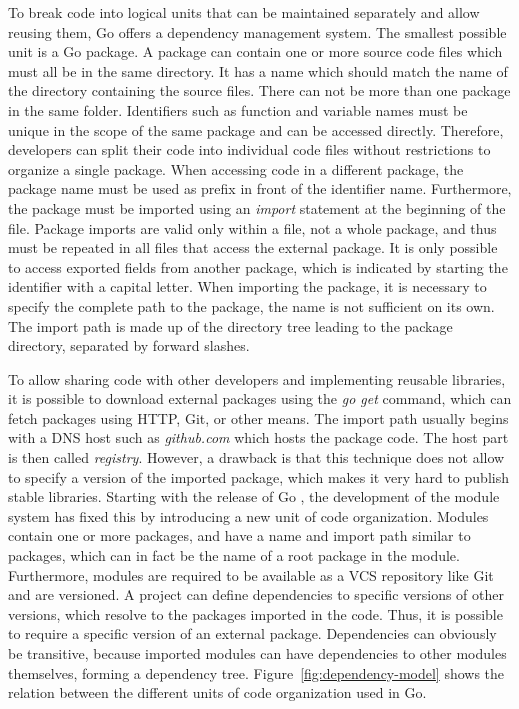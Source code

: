 To break code into logical units that can be maintained separately and allow reusing them, Go offers a dependency
management system.
The smallest possible unit is a Go package.
A package can contain one or more source code files which must all be in the same directory.
It has a name which should match the name of the directory containing the source files.
There can not be more than one package in the same folder.
Identifiers such as function and variable names must be unique in the scope of the same package and can be accessed
directly.
Therefore, developers can split their code into individual code files without restrictions to organize a single package.
When accessing code in a different package, the package name must be used as prefix in front of the identifier name.
Furthermore, the package must be imported using an \textit{import} statement at the beginning of the file.
Package imports are valid only within a file, not a whole package, and thus must be repeated in all files that access
the external package.
It is only possible to access exported fields from another package, which is indicated by starting the identifier with
a capital letter.
When importing the package, it is necessary to specify the complete path to the package, the name is not sufficient on
its own.
The import path is made up of the directory tree leading to the package directory, separated by forward slashes.

To allow sharing code with other developers and implementing reusable libraries, it is possible to download external
packages using the \textit{go get} command, which can fetch packages using \acrshort{HTTP}, Git, or other means.
The import path usually begins with a \acrshort{DNS} host such as \textit{github.com} which hosts the package code.
The host part is then called \textit{registry}.
However, a drawback is that this technique does not allow to specify a version of the imported package, which makes it
very hard to publish stable libraries.
Starting with the release of Go , the development of the module system has fixed this by introducing a
new unit of code organization.
Modules contain one or more packages, and have a name and import path similar to packages, which can in fact be the name
of a root package in the module.
Furthermore, modules are required to be available as a \acrshort{VCS} repository like Git and are versioned.
A project can define dependencies to specific versions of other versions, which resolve to the packages imported in the
code.
Thus, it is possible to require a specific version of an external package.
Dependencies can obviously be transitive, because imported modules can have dependencies to other modules themselves,
forming a dependency tree.
Figure~\ref{fig:dependency-model} shows the relation between the different units of code organization used in Go.

